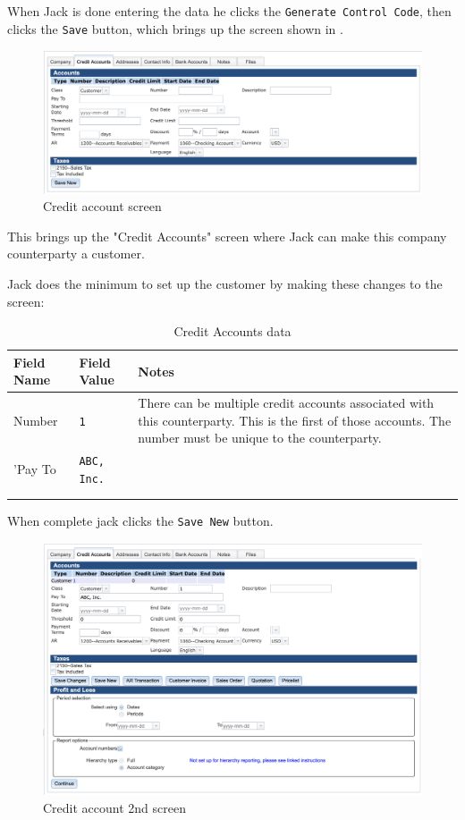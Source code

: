 When Jack is done entering the data he clicks the \texttt{Generate Control Code}, 
then clicks the \texttt{Save} button, 
which brings up the screen shown in .

\begin{figure}[H]
    \centering
    \includegraphics[width=\linewidth]{images/contact-credit-accounts-1.png}
    \caption{Credit account screen}
    \label{fig:contacts-credit-account-screen}
\end{figure}

This brings up the "Credit Accounts" screen  where Jack can make this company \gls{counterparty} a customer.

Jack does the minimum to set up the customer by making these changes to the screen:
\begin{longtable}{ llp{6cm} }
    Field Name & Field Value & Notes \\ \hline
    \endhead
    Number &\texttt{1} & There can be multiple credit accounts associated with this \gls{counterparty}. This is the first of those accounts. The number must be unique to the  \gls{counterparty}. \\
    'Pay To & \texttt{ABC, Inc.} & \\
    & & \\
    \caption{Credit Accounts data}
    \label{fig:ramping-credit-accounts-data}
\end{longtable}

When complete jack clicks the \texttt{Save New} button.

\begin{figure}[H]
    \centering
    \includegraphics[width=\linewidth]{images/contact-credit-accounts-2.png}
    \caption{Credit account 2nd screen}
    \label{fig:contacts-credit-account2-screen}
\end{figure}

